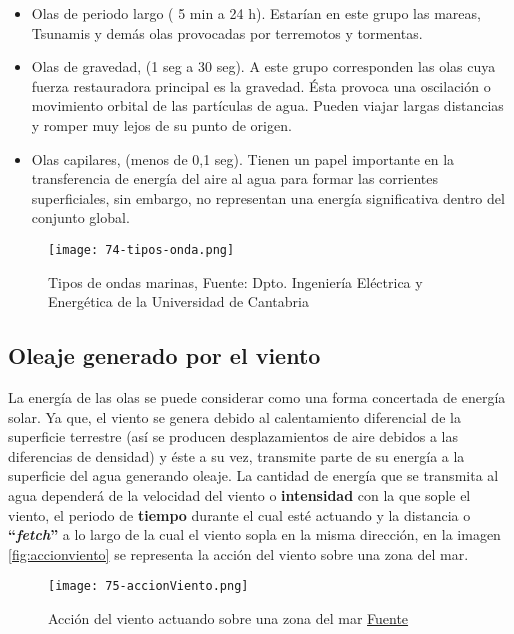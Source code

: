 \begin{itemize}
  \begin{itemize}
  \item
    Olas de periodo largo ( 5 min a 24 h). Estarían en este grupo las
    mareas, Tsunamis y demás olas provocadas por terremotos y tormentas.
  \item
    Olas de gravedad, (1 seg a 30 seg). A este grupo corresponden las
    olas cuya fuerza restauradora principal es la gravedad. Ésta provoca
    una oscilación o movimiento orbital de las partículas de agua.
    Pueden viajar largas distancias y romper muy lejos de su punto de
    origen.
  \item
    Olas capilares, (menos de 0,1 seg). Tienen un papel importante en la
    transferencia de energía del aire al agua para formar las corrientes
    superficiales, sin embargo, no representan una energía significativa
    dentro del conjunto global.
  \end{itemize}
\end{itemize}

\begin{figure}
\centering
\texttt{[image: 74-tipos-onda.png]}
\caption[Tipos de ondas marinas]{Tipos de ondas marinas, Fuente: Dpto. Ingeniería
Eléctrica y Energética de la Universidad de Cantabria}
\label{fig:tiposonda}
\end{figure}



\subsection{Oleaje generado por el viento}\label{header-n126}

La energía de las olas se puede considerar como una forma concertada de
energía solar. Ya que, el viento se genera debido al calentamiento
diferencial de la superficie terrestre (así se producen desplazamientos
de aire debidos a las diferencias de densidad) y éste a su vez,
transmite parte de su energía a la superficie del agua generando oleaje.
La cantidad de energía que se transmita al agua dependerá de la
velocidad del viento o \textbf{intensidad} con la que sople el viento,
el periodo de \textbf{tiempo} durante el cual esté actuando y la
distancia o \textbf{``\emph{fetch}''} a lo largo de la cual el viento
sopla en la misma dirección, en la imagen \autoref{fig:accionviento} se representa la acción del viento sobre una zona del mar.

\begin{figure}
\centering
\texttt{[image: 75-accionViento.png]}
\caption[Acción del viento]{Acción del viento actuando sobre una zona del mar \href{http://es.pfernandezdiez.es/index.php?pageID=15}{Fuente}}
\label{fig:accionviento}
\end{figure}



